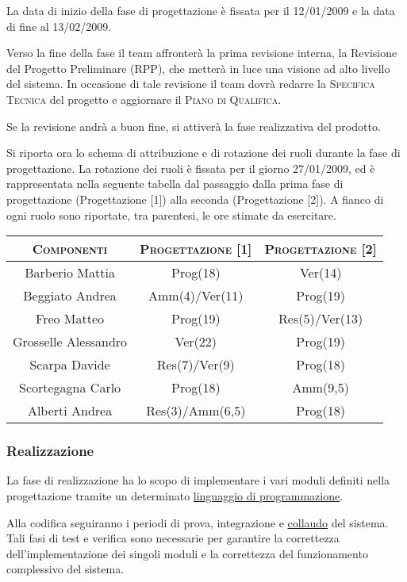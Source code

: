 \documentclass[11pt,a4paper]{article}
\begin{document}
La data di inizio della fase di progettazione è fissata per il 12/01/2009 e la data di fine al 13/02/2009.

Verso la fine della fase il team affronterà la prima revisione interna, la Revisione del Progetto Preliminare (RPP), che metterà in luce una visione ad alto livello del sistema.
In occasione di tale revisione il team dovrà redarre la \textsc{Specifica Tecnica} del progetto e aggiornare il \textsc{Piano di Qualifica}.

Se la revisione andrà a buon fine, si attiverà la fase realizzativa del prodotto.



Si riporta ora lo schema di attribuzione e di rotazione dei ruoli durante la fase di progettazione.
La rotazione dei ruoli è fissata per il giorno 27/01/2009, ed è rappresentata nella seguente tabella dal passaggio dalla prima fase di progettazione (Progettazione [1]) alla seconda (Progettazione [2]).
A fianco di ogni ruolo sono riportate, tra parentesi, le ore stimate da esercitare.
\\
\begin{center}
\begin{tabular}{|c||c|c|}
\hline
\textsc{Componenti} & \textsc{Progettazione [1]} & \textsc{Progettazione [2]} \\ \hline \hline
Barberio Mattia & Prog(18) & Ver(14) \\ \hline
Beggiato Andrea & Amm(4)/Ver(11) & Prog(19) \\ \hline
Freo Matteo & Prog(19) & Res(5)/Ver(13) \\ \hline
Grosselle Alessandro & Ver(22) & Prog(19) \\ \hline
Scarpa Davide & Res(7)/Ver(9) & Prog(18) \\ \hline
Scortegagna Carlo & Prog(18) & Amm(9,5) \\ \hline
Alberti Andrea & Res(3)/Amm(6,5) & Prog(18) \\ \hline
\end{tabular}
\end{center}
\bigskip
\subsubsection{Realizzazione}
La fase di realizzazione ha lo scopo di implementare i vari moduli definiti nella progettazione tramite un determinato \underline{linguaggio di programmazione}.

Alla codifica seguiranno i periodi di prova, integrazione e \underline{collaudo} del sistema.
Tali fasi di test e verifica sono necessarie per garantire la correttezza dell'implementazione dei singoli moduli e la correttezza del funzionamento complessivo del sistema.
\end{document}
